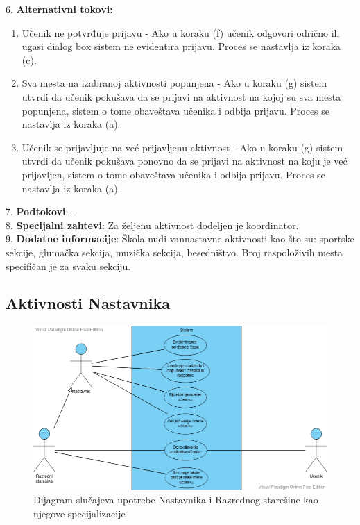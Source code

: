\documentclass{article}
\begin{document}
6. \textbf{Alternativni tokovi:}
\begin{enumerate} [label=(\roman*)]
\item Učenik ne potvrđuje prijavu - Ako u koraku (f) učenik odgovori odrično ili ugasi dialog box sistem ne evidentira prijavu. Proces se nastavlja iz koraka (c). 
\item Sva mesta na izabranoj aktivnosti popunjena - Ako u koraku (g) sistem utvrdi da učenik pokušava da se prijavi na aktivnost na kojoj su sva mesta popunjena, sistem o tome obaveštava učenika i odbija prijavu. Proces se nastavlja iz koraka (a).
\item Učenik se prijavljuje na već prijavljenu aktivnost - Ako u koraku (g) sistem utvrdi da učenik pokušava ponovno da se prijavi na aktivnost na koju je već prijavljen, sistem o tome obaveštava učenika i odbija prijavu. Proces se nastavlja iz koraka (a).

\end{enumerate}

7. \textbf{Podtokovi}: - \\

8. \textbf{Specijalni zahtevi}: Za željenu aktivnost dodeljen je koordinator. \\

9. \textbf{Dodatne informacije}: Škola nudi vannastavne aktivnosti kao što su: sportske sekcije, glumačka sekcija, muzička sekcija, besedništvo. Broj raspoloživih mesta specifičan je za svaku sekciju. \\

\newpage
\subsection{Aktivnosti Nastavnika}

\begin{figure} [!ht]
    \begin{center}
        \includegraphics[scale=0.45]{imgs/nastavnik_use_case.png}
    \end{center}
\caption{Dijagram slučajeva upotrebe Nastavnika i Razrednog starešine kao njegove specijalizacije}
\end{figure}
\end{document}
